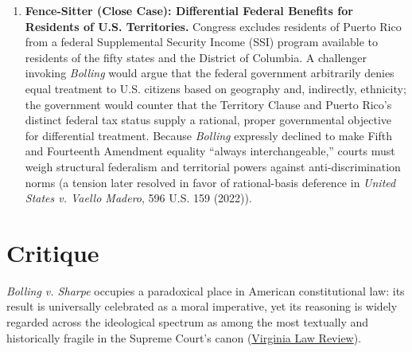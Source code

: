 \documentclass[12pt]{article}
\begin{document}
\begin{enumerate}
  \item \textbf{Fence-Sitter (Close Case): Differential Federal Benefits for Residents of U.S. Territories.} Congress excludes residents of Puerto Rico from a federal Supplemental Security Income (SSI) program available to residents of the fifty states and the District of Columbia. A challenger invoking \textit{Bolling} would argue that the federal government arbitrarily denies equal treatment to U.S. citizens based on geography and, indirectly, ethnicity; the government would counter that the Territory Clause and Puerto Rico's distinct federal tax status supply a rational, proper governmental objective for differential treatment. Because \textit{Bolling} expressly declined to make Fifth and Fourteenth Amendment equality ``always interchangeable,'' courts must weigh structural federalism and territorial powers against anti-discrimination norms (a tension later resolved in favor of rational-basis deference in \textit{United States v. Vaello Madero}, 596 U.S. 159 (2022)).
\end{enumerate}

\section{Critique}

\textit{Bolling v. Sharpe} occupies a paradoxical place in American constitutional law: its result is universally celebrated as a moral imperative, yet its reasoning is widely regarded across the ideological spectrum as among the most textually and historically fragile in the Supreme Court's canon (\href{https://virginialawreview.org/wp-content/uploads/2020/12/1879.pdf}{Virginia Law Review}).
\end{document}
